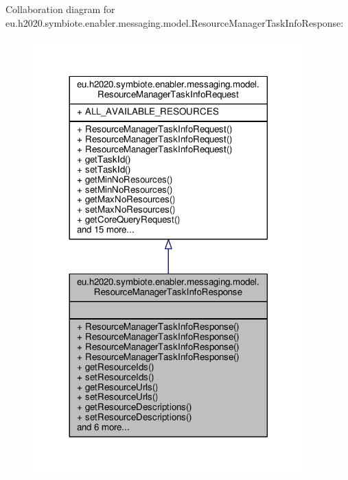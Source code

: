 Collaboration diagram for eu.\+h2020.\+symbiote.\+enabler.\+messaging.\+model.\+Resource\+Manager\+Task\+Info\+Response\+:
\nopagebreak
\begin{figure}[H]
\begin{center}
\leavevmode
\includegraphics[width=296pt]{classeu_1_1h2020_1_1symbiote_1_1enabler_1_1messaging_1_1model_1_1ResourceManagerTaskInfoResponse__coll__graph}
\end{center}
\end{figure}
